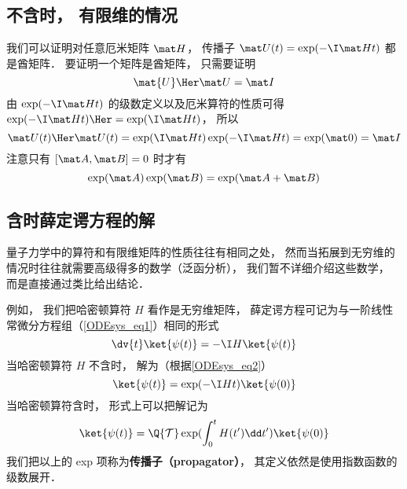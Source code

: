 

\subsection{不含时， 有限维的情况}
我们可以证明对任意厄米矩阵 $\mat H$， 传播子 $\mat U(t) = \exp(-\I \mat H t)$ 都是酋矩阵． 要证明一个矩阵是酋矩阵， 只需要证明
\begin{equation}
\mat{U}\Her \mat U = \mat I
\end{equation}
由 $\exp(-\I \mat H t)$ 的级数定义以及厄米算符的性质可得 $\exp(-\I \mat H t)\Her = \exp(\I \mat H t)$， 所以
\begin{equation}
\mat U(t)\Her \mat U(t) = \exp(\I \mat H t) \exp(-\I \mat H t) = \exp(\mat 0) = \mat I
\end{equation}
注意只有 $[\mat A, \mat B] = 0$ 时才有
\begin{equation}
\exp(\mat A)\exp(\mat B) = \exp(\mat A + \mat B)
\end{equation}

\subsection{含时薛定谔方程的解}

量子力学中的算符和有限维矩阵的性质往往有相同之处， 然而当拓展到无穷维的情况时往往就需要高级得多的数学（泛函分析）， 我们暂不详细介绍这些数学， 而是直接通过类比给出结论．

例如， 我们把哈密顿算符 $H$ 看作是无穷维矩阵， 薛定谔方程可记为与一阶线性常微分方程组（\autoref{ODEsys_eq1}）相同的形式
\begin{equation}
\dv{t} \ket{\psi(t)} = -\I H \ket{\psi(t)}
\end{equation}
当哈密顿算符 $H$ 不含时， 解为（根据\autoref{ODEsys_eq2}）
\begin{equation}
\ket{\psi(t)} = \exp(-\I H t) \ket{\psi(0)}
\end{equation}
当哈密顿算符含时， 形式上可以把解记为
\begin{equation}
\ket{\psi(t)} = \Q {\mathcal T} \exp(\int_0^ t H(t')\dd t') \ket{\psi(0)}
\end{equation}
我们把以上的 exp 项称为\textbf{传播子（propagator）}， 其定义依然是使用指数函数的级数展开．
